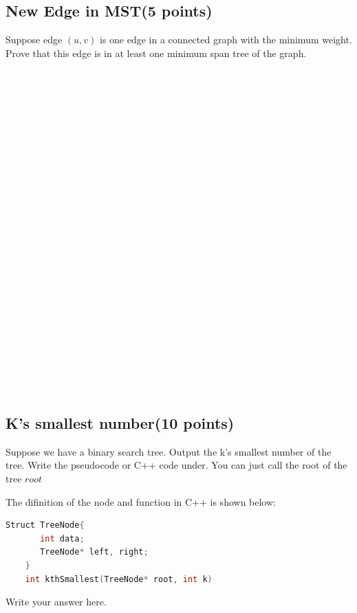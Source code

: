 \documentclass[11pt]{exam}
\begin{document}
    \subsection{New Edge in MST(5 points)}
    Suppose edge $(u,v)$ is one edge in a connected graph with the minimum weight. Prove that this edge is in at least one minimum span tree of the graph.\par 
    \begin{solution}
    \\ \hspace*{\fill} \\
    \\ \hspace*{\fill} \\
    \\ \hspace*{\fill} \\
    \\ \hspace*{\fill} \\
    \\ \hspace*{\fill} \\
    \\ \hspace*{\fill} \\
    \\ \hspace*{\fill} \\
    \\ \hspace*{\fill} \\
    \\ \hspace*{\fill} \\
    \\ \hspace*{\fill} \\
    \\ \hspace*{\fill} \\
    \\ \hspace*{\fill} \\
    \end{solution}
    \newpage
    \subsection{K's smallest number(10 points)}
    Suppose we have a binary search tree. Output the k's smallest number of the tree. Write the pseudocode or C++ code under. You can just call the root of the tree $root$\par 
    The difinition of the node and function in C++ is shown below:
    \begin{lstlisting}[language = C++]
    Struct TreeNode{
       int data;
       TreeNode* left, right; 
    }
    int kthSmallest(TreeNode* root, int k)
    \end{lstlisting}
    Write your answer here.
    \clearpage
    
\end{document}
